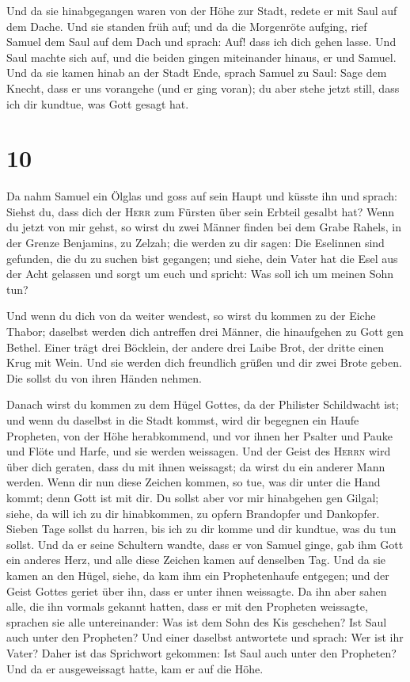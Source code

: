  Und da sie hinabgegangen waren von der Höhe zur Stadt,
redete er mit Saul auf dem Dache.  Und sie standen früh
auf; und da die Morgenröte aufging, rief Samuel dem Saul auf dem Dach
und sprach: Auf! dass ich dich gehen lasse. Und Saul machte sich auf,
und die beiden gingen miteinander hinaus, er und Samuel. 
Und da sie kamen hinab an der Stadt Ende, sprach Samuel zu Saul: Sage
dem Knecht, dass er uns vorangehe (und er ging voran); du aber stehe
jetzt still, dass ich dir kundtue, was Gott gesagt hat.

\hypertarget{section-9}{%
\section{10}\label{section-9}}

 Da nahm Samuel ein Ölglas und goss auf sein Haupt und
küsste ihn und sprach: Siehst du, dass dich der \textsc{Herr} zum
Fürsten über sein Erbteil gesalbt hat?  Wenn du jetzt von
mir gehst, so wirst du zwei Männer finden bei dem Grabe Rahels, in der
Grenze Benjamins, zu Zelzah; die werden zu dir sagen: Die Eselinnen sind
gefunden, die du zu suchen bist gegangen; und siehe, dein Vater hat die
Esel aus der Acht gelassen und sorgt um euch und spricht: Was soll ich
um meinen Sohn tun?

 Und wenn du dich von da weiter wendest, so wirst du
kommen zu der Eiche Thabor; daselbst werden dich antreffen drei Männer,
die hinaufgehen zu Gott gen Bethel. Einer trägt drei Böcklein, der
andere drei Laibe Brot, der dritte einen Krug mit Wein. 
Und sie werden dich freundlich grüßen und dir zwei Brote geben. Die
sollst du von ihren Händen nehmen.

 Danach wirst du kommen zu dem Hügel Gottes, da der
Philister Schildwacht ist; und wenn du daselbst in die Stadt kommst,
wird dir begegnen ein Haufe Propheten, von der Höhe herabkommend, und
vor ihnen her Psalter und Pauke und Flöte und Harfe, und sie werden
weissagen.  Und der Geist des \textsc{Herrn} wird über
dich geraten, dass du mit ihnen weissagst; da wirst du ein anderer Mann
werden.  Wenn dir nun diese Zeichen kommen, so tue, was
dir unter die Hand kommt; denn Gott ist mit dir.  Du
sollst aber vor mir hinabgehen gen Gilgal; siehe, da will ich zu dir
hinabkommen, zu opfern Brandopfer und Dankopfer. Sieben Tage sollst du
harren, bis ich zu dir komme und dir kundtue, was du tun sollst.
 Und da er seine Schultern wandte, dass er von Samuel
ginge, gab ihm Gott ein anderes Herz, und alle diese Zeichen kamen auf
denselben Tag.  Und da sie kamen an den Hügel, siehe, da
kam ihm ein Prophetenhaufe entgegen; und der Geist Gottes geriet über
ihn, dass er unter ihnen weissagte.  Da ihn aber sahen
alle, die ihn vormals gekannt hatten, dass er mit den Propheten
weissagte, sprachen sie alle untereinander: Was ist dem Sohn des Kis
geschehen? Ist Saul auch unter den Propheten?  Und einer
daselbst antwortete und sprach: Wer ist ihr Vater? Daher ist das
Sprichwort gekommen: Ist Saul auch unter den Propheten? 
Und da er ausgeweissagt hatte, kam er auf die Höhe.

